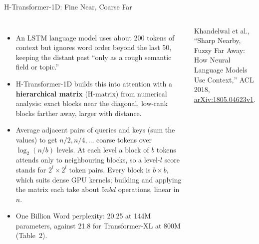 \begin{frame}{H-Transformer-1D: Fine Near, Coarse Far}
  \begin{columns}[T,onlytextwidth]
      \begin{itemize}\footnotesize\itemsep0.25em
        \item[\textcolor{red}{$\blacktriangleright$}] An LSTM language model uses about 200 tokens of context but ignores word order beyond the last 50, keeping the distant past ``only as a rough semantic field or topic.''
        \item[\textcolor{red}{$\blacktriangleright$}] H-Transformer-1D builds this into attention with a \textbf{hierarchical matrix} (H-matrix) from numerical analysis: exact blocks near the diagonal, low-rank blocks farther away, larger with distance.
        \item[\textcolor{red}{$\blacktriangleright$}] Average adjacent pairs of queries and keys (sum the values) to get $n/2, n/4, \dots$ coarse tokens over $\log_2(n/b)$ levels. At each level a block of $b$ tokens attends only to neighbouring blocks, so a level-$l$ score stands for $2^l \times 2^l$ token pairs. Every block is $b \times b$, which suits dense GPU kernels; building and applying the matrix each take about $5nbd$ operations, linear in $n$.
        \item[\textcolor{red}{$\blacktriangleright$}] One Billion Word perplexity: 20.25 at 144M parameters, against 21.8 for Transformer-XL at 800M (Table~2).
      \end{itemize}
      \vspace{0.1em}
      {\scriptsize Khandelwal et al., ``Sharp Nearby, Fuzzy Far Away: How Neural Language Models Use Context,'' ACL 2018, \href{https://arxiv.org/abs/1805.04623v1}{arXiv:1805.04623v1}.\par}
      \centering
\end{columns}
\end{frame}
